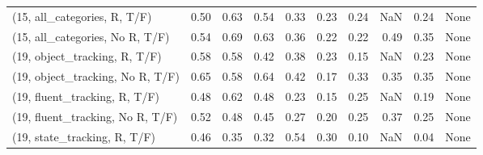 \begin{table*}[h!]
\begin{adjustbox}{width=2\columnwidth,center}
\begin{tabular}{lrrr|rrr|rrr}
(15, all\_categories, R, T/F)          &                      0.50 &                  0.63 &                      0.54 &                          0.33 &                      0.23 &                          0.24 &                                    NaN &                               0.24 &                                  None \\
(15, all\_categories, No R, T/F)       &                      0.54 &                  0.69 &                      0.63 &                          0.36 &                      0.22 &                          0.22 &                                   0.49 &                               0.35 &                                  None \\



\midrule
(19, object\_tracking, R, T/F)         &                      0.58 &                  0.58 &                      0.42 &                          0.38 &                      0.23 &                          0.15 &                                    NaN &                               0.23 &                                  None \\
(19, object\_tracking, No R, T/F)      &                      0.65 &                  0.58 &                      0.64 &                          0.42 &                      0.17 &                          0.33 &                                   0.35 &                               0.35 &                                  None \\
(19, fluent\_tracking, R, T/F)         &                      0.48 &                  0.62 &                      0.48 &                          0.23 &                      0.15 &                          0.25 &                                    NaN &                               0.19 &                                  None \\
(19, fluent\_tracking, No R, T/F)      &                      0.52 &                  0.48 &                      0.45 &                          0.27 &                      0.20 &                          0.25 &                                   0.37 &                               0.25 &                                  None \\
(19, state\_tracking, R, T/F)          &                      0.46 &                  0.35 &                      0.32 &                          0.54 &                      0.30 &                          0.10 &                                    NaN &                               0.04 &                                  None \\

\end{tabular}
\end{adjustbox}
\end{table*}

